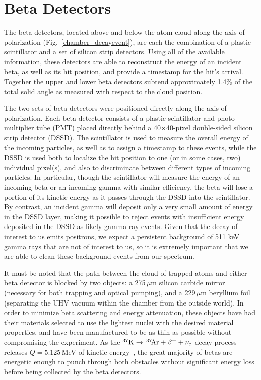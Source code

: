 {
	\pagebreak
}
{}
\section{Beta Detectors}
\label{section:betadetectors}
The beta detectors, located above and below the atom cloud along the axis of polarization (Fig.~\ref{chamber_decayevent}), are each the combination of a plastic scintillator and a set of silicon strip detectors.  Using all of the available information, these detectors are able to reconstruct the energy of an incident beta, as well as its hit position, and provide a timestamp for the hit's arrival.  Together the upper and lower beta detectors subtend approximately 1.4\% of the total solid angle as measured with respect to the cloud position. 

	The two sets of beta detectors were positioned directly along the axis of polarization.  Each beta detector consists of a plastic scintillator and photo-multiplier tube (PMT)  placed directly behind a 40$\times$40-pixel double-sided silicon strip detector (DSSD).    The scintillator is used to measure the overall energy of the incoming particles, as well as to assign a timestamp to these events, while the DSSD is used both to localize the hit position to one (or in some cases, two) individual pixel(s), and also to discriminate between different types of incoming particles.  In particular, though the scintillator will measure the energy of an incoming beta or an incoming gamma with similar efficiency, the beta will lose a portion of its kinetic energy as it passes through the DSSD into the scintillator.  By contrast, an incident gamma will deposit only a very small amount of energy in the DSSD layer, making it possible to reject events with insufficient energy deposited in the DSSD as likely gamma ray events.  Given that the decay of interest to us emits positrons, we expect a persistent background of 511 keV gamma rays that are not of interest to us, so it is extremely important that we are able to clean these background events from our spectrum. 


It must be noted that the path between the cloud of trapped atoms and either beta detector is blocked by two objects:  a 275$\,\mu$m silicon carbide mirror (necessary for both trapping and optical pumping), and a 229$\,\mu$m beryllium foil (separating the UHV vacuum within the chamber from the outside world).  In order to minimize beta scattering and energy attenuation, these objects have had their materials selected to use the lightest nuclei with the desired material properties, and have been manufactured to be as thin as possible without compromising the experiment.  As the $^{37}\textrm{K} \rightarrow \,^{37}\textrm{\!Ar} + \beta^{+} + \nu_e$ decay process releases $Q=5.125$\,MeV of kinetic energy~\cite{Q_value}, the great majority of betas are energetic enough to punch through both obstacles without significant energy loss before being collected by the beta detectors.  




